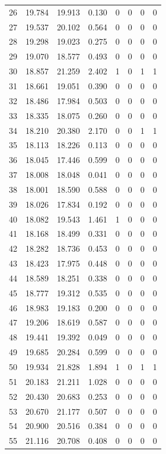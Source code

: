 \begin{longtable}{rrrrrrrr}
26 & 19.784 & 19.913 & 0.130 & 0 & 0 & 0 & 0\\
27 & 19.537 & 20.102 & 0.564 & 0 & 0 & 0 & 0\\
28 & 19.298 & 19.023 & 0.275 & 0 & 0 & 0 & 0\\
29 & 19.070 & 18.577 & 0.493 & 0 & 0 & 0 & 0\\
30 & 18.857 & 21.259 & 2.402 & 1 & 0 & 1 & 1\\
31 & 18.661 & 19.051 & 0.390 & 0 & 0 & 0 & 0\\
32 & 18.486 & 17.984 & 0.503 & 0 & 0 & 0 & 0\\
33 & 18.335 & 18.075 & 0.260 & 0 & 0 & 0 & 0\\
34 & 18.210 & 20.380 & 2.170 & 0 & 0 & 1 & 1\\
35 & 18.113 & 18.226 & 0.113 & 0 & 0 & 0 & 0\\
36 & 18.045 & 17.446 & 0.599 & 0 & 0 & 0 & 0\\
37 & 18.008 & 18.048 & 0.041 & 0 & 0 & 0 & 0\\
38 & 18.001 & 18.590 & 0.588 & 0 & 0 & 0 & 0\\
39 & 18.026 & 17.834 & 0.192 & 0 & 0 & 0 & 0\\
40 & 18.082 & 19.543 & 1.461 & 1 & 0 & 0 & 0\\
41 & 18.168 & 18.499 & 0.331 & 0 & 0 & 0 & 0\\
42 & 18.282 & 18.736 & 0.453 & 0 & 0 & 0 & 0\\
43 & 18.423 & 17.975 & 0.448 & 0 & 0 & 0 & 0\\
44 & 18.589 & 18.251 & 0.338 & 0 & 0 & 0 & 0\\
45 & 18.777 & 19.312 & 0.535 & 0 & 0 & 0 & 0\\
46 & 18.983 & 19.183 & 0.200 & 0 & 0 & 0 & 0\\
47 & 19.206 & 18.619 & 0.587 & 0 & 0 & 0 & 0\\
48 & 19.441 & 19.392 & 0.049 & 0 & 0 & 0 & 0\\
49 & 19.685 & 20.284 & 0.599 & 0 & 0 & 0 & 0\\
50 & 19.934 & 21.828 & 1.894 & 1 & 0 & 1 & 1\\
51 & 20.183 & 21.211 & 1.028 & 0 & 0 & 0 & 0\\
52 & 20.430 & 20.683 & 0.253 & 0 & 0 & 0 & 0\\
53 & 20.670 & 21.177 & 0.507 & 0 & 0 & 0 & 0\\
54 & 20.900 & 20.516 & 0.384 & 0 & 0 & 0 & 0\\
55 & 21.116 & 20.708 & 0.408 & 0 & 0 & 0 & 0\\

\end{longtable}
